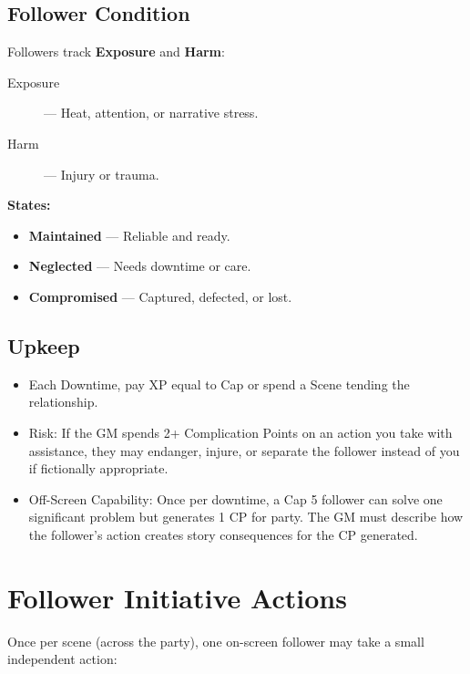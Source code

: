 \subsection*{Follower Condition}

Followers track \textbf{Exposure} and \textbf{Harm}:

\begin{description}
  \item[Exposure] — Heat, attention, or narrative stress.
  \item[Harm] — Injury or trauma.
\end{description}

\textbf{States:}
\begin{itemize}
  \item \textbf{Maintained} — Reliable and ready.
  \item \textbf{Neglected} — Needs downtime or care.
  \item \textbf{Compromised} — Captured, defected, or lost.
\end{itemize}

\subsection*{Upkeep}

\begin{itemize}
  \item Each Downtime, pay XP equal to Cap or spend a Scene tending the relationship.
  \item Risk: If the GM spends 2+ Complication Points  on an action you take with assistance, they may endanger, injure, or separate the follower instead of you if fictionally appropriate.
  \item Off-Screen Capability: Once per downtime, a Cap 5 follower can solve one significant problem but generates 1 CP for party. The GM must describe how the follower's action creates story consequences for the CP generated.
\end{itemize}

\section{Follower Initiative Actions}

Once per scene (across the party), one on-screen follower may take a small independent action:

